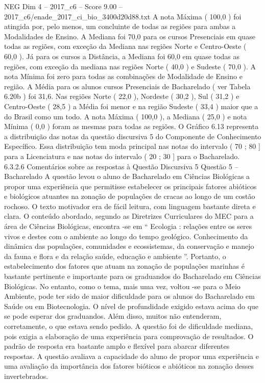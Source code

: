 \begin{textsample}{NEG Dim 4 – 2017\_c6 – Score 9.00 – 2017\_c6/enade\_2017\_ci\_bio\_3400d20d88.txt}
A nota Máxima ( 100,0 ) foi atingida por, pelo menos, um concluinte de todas as regiões para ambas a Modalidades de Ensino.
A Mediana foi 70,0 para os cursos Presenciais em quase todas as regiões, com exceção da Mediana nas regiões Norte e Centro-Oeste ( 60,0 ).
Já para os cursos a Distância, a Mediana foi 60,0 em quase todas as regiões, com exceção da mediana nas regiões Norte ( 40,0 ) e Sudeste ( 70,0 ).
A nota Mínima foi zero para todas as combinações de Modalidade de Ensino e região.
A Média para os alunos cursos Presenciais de Bacharelado ( ver Tabela 6.20b ) foi 31,6.
Nas regiões Norte ( 22,0 ), Nordeste ( 30,2 ), Sul ( 31,2 ) e Centro-Oeste ( 28,5 ) a Média foi menor e na região Sudeste ( 33,4 ) maior que a do Brasil como um todo.
A nota Máxima ( 100,0 ), a Mediana ( 25,0 ) e nota Mínima ( 0,0 ) foram as mesmas para todas as regiões.
O Gráfico 6.13 representa a distribuição das notas da questão discursiva 5 do Componente de Conhecimento Específico.
Essa distribuição tem moda principal nas notas do intervalo ( 70 ; 80 ] para a Licenciatura e nas notas do intervalo ( 20 ; 30 ] para o Bacharelado. 6.3.2.6 Comentários sobre as respostas à Questão Discursiva 5 Questão 5 – Bacharelado A questão levou o aluno de Bacharelado em Ciências Biológicas a propor uma experiência que permitisse estabelecer os principais fatores abióticos e biológicos atuantes na zonação de populações de cracas ao longo de um costão rochoso.
O texto motivador era de fácil leitura, com linguagem bastante direta e clara.
O conteúdo abordado, segundo as Diretrizes Curriculares do MEC para a área de Ciências Biológicas, encontra -se em “ Ecologia : relações entre os seres vivos e destes com o ambiente ao longo do tempo geológico.
Conhecimento da dinâmica das populações, comunidades e ecossistemas, da conservação e manejo da fauna e flora e da relação saúde, educação e ambiente ”.
Portanto, o estabelecimento dos fatores que atuam na zonação de populações marinhas é bastante pertinente e importante para os graduandos do Bacharelado em Ciências Biológicas.
No entanto, como o tema, mais uma vez, voltou -se para o Meio Ambiente, pode ter sido de maior dificuldade para os alunos do Bacharelado em Saúde ou em Biotecnologia.
O nível de profundidade exigido estava acima do que se pode esperar dos graduandos.
Além disso, muitos não entenderam, corretamente, o que estava sendo pedido.
A questão foi de dificuldade mediana, pois exigia a elaboração de uma experiência para comprovação de resultados.
O padrão de resposta era bastante amplo e flexível para abarcar diferentes respostas.
A questão avaliava a capacidade do aluno de propor uma experiência e uma avaliação da importância dos fatores bióticos e abióticos na zonação desses invertebrados.

\end{textsample}
